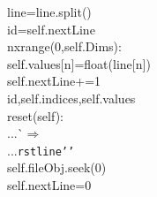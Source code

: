 {{\begin{tabbing}
\hspace{48pt}line\hspace{6pt}=\hspace{6pt}line.split()\\
\hspace{48pt}id\hspace{6pt}=\hspace{6pt}self.nextLine\\
\hspace{6pt}n\hspace{6pt}xrange(0,self.Dims):\\
\hspace{72pt}self.values{[}n{]}\hspace{6pt}=\hspace{6pt}float(line{[}n{]})\\
\hspace{48pt}self.nextLine+=1\\
\hspace{6pt}id,self.indices,self.values\\
\hspace{6pt}reset(self):\\
...\`$\Rightarrow$\\
...{}{\texttt{rst\hspace{6pt}line\hspace{6pt}{'}}}{\texttt{{'}{'}}}\\
\hspace{48pt}self.fileObj.seek(0)\\
\hspace{48pt}self.nextLine\hspace{6pt}=\hspace{6pt}0\\

\end{tabbing}}}
